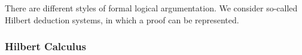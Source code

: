 





            There are different styles of formal logical argumentation. We consider so-called Hilbert deduction systems, in which a proof can be represented.

            \subsubsection{Hilbert Calculus}
                \label{sec:hilbert-calculus}

